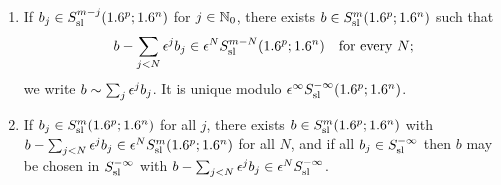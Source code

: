 \begin{lemma}\label{semiclassical:lem:borel}
  \begin{enumerate}[label=\textup{(\roman*)}]
  \item If $b_j\in S^{m-j}_{\mathrm{sl}}(1.6^p;1.6^n)$ for $j\in\mathbb{N}_0$, there exists
    $b\in S^{m}_{\mathrm{sl}}(1.6^p;1.6^n)$ such that
    \begin{equation}\label{semiclassical:eq:double-asymptotic}
      b-\sum_{j<N}\epsilon^jb_j\in\epsilon^NS^{m-N}_{\mathrm{sl}}(1.6^p;1.6^n)\quad\text{for every }N;
    \end{equation}
    we write $b\sim\sum_j\epsilon^jb_j$. It is unique modulo
    $\epsilon^\infty S^{-\infty}_{\mathrm{sl}}(1.6^p;1.6^n)$.
  \item If $b_j\in S^{m}_{\mathrm{sl}}(1.6^p;1.6^n)$ for all $j$, there exists
    $b\in S^{m}_{\mathrm{sl}}(1.6^p;1.6^n)$ with $b-\sum_{j<N}\epsilon^jb_j\in\epsilon^NS^{m}_{\mathrm{sl}}(1.6^p;1.6^n)$
    for all $N$, and if all $b_j\in S^{-\infty}_{\mathrm{sl}}$ then $b$ may be chosen in
    $S^{-\infty}_{\mathrm{sl}}$ with $b-\sum_{j<N}\epsilon^jb_j\in\epsilon^NS^{-\infty}_{\mathrm{sl}}$.
  \end{enumerate}
\end{lemma}

